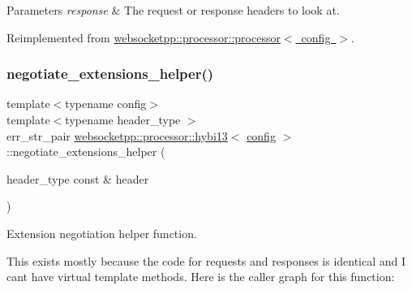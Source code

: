 \begin{DoxyParams}{Parameters}
{\em response} & The request or response headers to look at. \\
\hline
\end{DoxyParams}


Reimplemented from \mbox{\hyperlink{classwebsocketpp_1_1processor_1_1processor_a236ab7829e607fa58cc94c219a1a680c}{websocketpp\+::processor\+::processor$<$ config $>$}}.

\mbox{\label{classwebsocketpp_1_1processor_1_1hybi13_a2bba499a185aa0219c2389532a332393}} 
\subsubsection{\texorpdfstring{negotiate\+\_\+extensions\+\_\+helper()}{negotiate\_extensions\_helper()}}
{\footnotesize\ttfamily template$<$typename config$>$ \\
template$<$typename header\+\_\+type $>$ \\
err\+\_\+str\+\_\+pair \mbox{\hyperlink{classwebsocketpp_1_1processor_1_1hybi13}{websocketpp\+::processor\+::hybi13}}$<$ \mbox{\hyperlink{classconfig}{config}} $>$\+::negotiate\+\_\+extensions\+\_\+helper (\begin{DoxyParamCaption}\item[{header\+\_\+type const \&}]{header }\end{DoxyParamCaption})\hspace{0.3cm}{\ttfamily [inline]}}



Extension negotiation helper function. 

This exists mostly because the code for requests and responses is identical and I can\textquotesingle{}t have virtual template methods. Here is the caller graph for this function\+:
\mbox{\label{classwebsocketpp_1_1processor_1_1hybi13_a8cbb98af828463c5ef80429a7ade715d}} 
